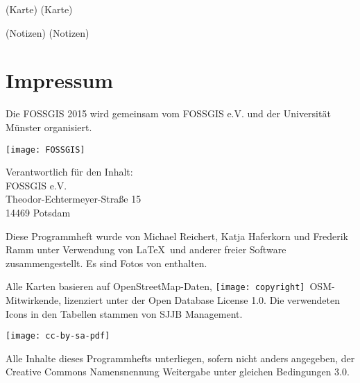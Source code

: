 \newpage
(Karte)
\label{karte}
\newpage
(Karte)
\newpage


\newpage
(Notizen)
\newpage
(Notizen)
\newpage


\newpage
\section*{Impressum}
\label{impressum}
\vspace{-0.5em}


\begin{raggedright}
Die FOSSGIS 2015 wird gemeinsam vom FOSSGIS e.V. und der Universität Münster 
organisiert.

\vspace{0.5em}
	\texttt{[image: FOSSGIS]}

\vspace{0.5em}
\noindent Verantwortlich für den Inhalt:\\
FOSSGIS e.V.\\
Theodor-Echtermeyer-Straße 15\\
14469 Potsdam

\vspace{1em}
\noindent Diese Programmheft wurde von Michael Reichert, Katja Haferkorn und 
Frederik Ramm unter Verwendung von \LaTeX\ und anderer freier Software zusammengestellt. Es sind Fotos von %
enthalten.

\vspace{0.5em}

\noindent Alle Karten basieren auf Open\-Street\-Map-Daten, 
\texttt{[image: copyright]}~OSM-Mitwirkende, lizenziert unter der Open Database License 1.0.
Die verwendeten Icons in den Tabellen stammen von SJJB Management.


\vspace{1em}
\noindent \begin{minipage}[htbp]{0.2\textwidth}
\noindent\texttt{[image: cc-by-sa-pdf]}
\end{minipage}
\hfill
\begin{minipage}[hbtp]{0.74\textwidth}\raggedright
Alle Inhalte dieses Programmhefts unterliegen, sofern nicht anders angegeben, 
der Creative Commons Namensnennung Weitergabe unter gleichen Bedingungen 3.0.
\end{minipage}
\end{raggedright}


